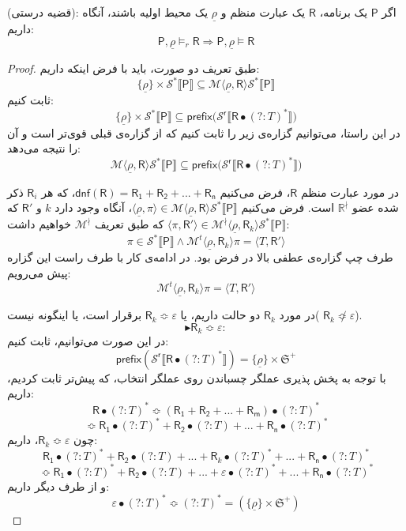 \begin{thm}
	(قضیه درستی): اگر $\mathsf{P}$ یک برنامه، $\mathsf{R}$ یک عبارت منظم و $\underline{\rho}$ یک محیط اولیه باشند، آنگاه داریم:
	$$\mathsf{P},\underline{\rho} \models_r \mathsf{R} \Rightarrow
	\mathsf{P},\underline{\rho} \models \mathsf{R}$$
\end{thm}
\begin{proof}
	طبق تعریف دو صورت، باید با فرض اینکه داریم:
	$$\{\underline{\rho}\}\times\mathcal{S}^* \llbracket \mathsf{P} \rrbracket \subseteq 
	\mathcal{M}\langle \underline{\rho},\mathsf{R} \rangle \mathcal{S}^* \llbracket \mathsf{P} \rrbracket$$
	ثابت کنیم:
	$$\{\underline{\rho}\}\times\mathcal{S}^* \llbracket \mathsf{P} \rrbracket \subseteq 
	\mathsf{prefix(\mathcal{S}^r \llbracket R \bullet (?:\mathit{T})^*} \rrbracket)$$
	در این راستا، می‌توانیم گزاره‌ی زیر را ثابت کنیم که از گزاره‌ی قبلی قوی‌تر است و آن را نتیجه می‌دهد:
	$$\mathcal{M}\langle \underline{\rho},\mathsf{R} \rangle \mathcal{S}^* \llbracket \mathsf{P} \rrbracket \subseteq \mathsf{prefix(\mathcal{S}^r \llbracket R \bullet (?:\mathit{T})^*} \rrbracket)$$
	
	در مورد عبارت منظم $\mathsf{R}$، فرض می‌کنیم
	$\mathsf{dnf(R)=R_1+R_2+...+R_n}$،
	که هر $\mathsf{R}_i$ ذکر شده عضو $\mathbb{R}^\nmid$ است. 
	فرض می‌کنیم
	$\langle \underline{\rho}, \pi \rangle \in \mathcal{M}\langle \underline{\rho},\mathsf{R} \rangle \mathcal{S}^* \llbracket \mathsf{P} \rrbracket$،
	آنگاه وجود دارد $k$ و $\mathsf{R'}$ که \break
	$\langle \pi , \mathsf{R'} \rangle  \in \mathcal{M}^\nmid\langle \underline{\rho},\mathsf{R}_k \rangle \mathcal{S}^* \llbracket \mathsf{P} \rrbracket$
	که طبق تعریف $\mathcal{M}^\nmid$ خواهیم داشت:
	$$\pi \in \mathcal{S}^* \llbracket \mathsf{P} \rrbracket \land \mathcal{M}^t \langle \underline{\rho},\mathsf{R}_k \rangle \pi = \langle \mathit{T},\mathsf{R'} \rangle$$
	طرف چپ گزاره‌ی عطفی بالا در فرض بود. در ادامه‌ی کار با طرف راست این گزاره پیش می‌رویم:
	$$\mathcal{M}^t \langle \underline{\rho},\mathsf{R}_k\rangle \pi = \langle \mathit{T},\mathsf{R'} \rangle$$

در مورد $\mathsf{R}_k$ دو حالت داریم، یا 
$\mathsf{R}_k \Bumpeq \varepsilon$
برقرار است، یا اینگونه نیست( 
$\mathsf{R}_k \not\Bumpeq \varepsilon$).
$$\blacktriangleright\mathsf{R}_k \Bumpeq \varepsilon:$$
در این صورت می‌توانیم، ثابت کنیم: 
$$\mathsf{prefix(\mathcal{S}^r \llbracket \mathsf{R} \bullet (?:\mathit{T})^* \rrbracket)}=
	\{\underline{\rho}\} \times \mathfrak{S}^+$$
با توجه به پخش پذیری عملگر چسباندن روی عملگر انتخاب، که پیش‌تر ثابت کردیم، داریم:
$$\mathsf{R}\bullet(?:\mathit{T})^* \Bumpeq \mathsf{(R_1 + R_2 + ... +R_m)}\bullet(?:\mathit{T})^*$$
$$\Bumpeq \mathsf{R_1}\bullet (?:\mathit{T})^* + \mathsf{R_2} \bullet (?:\mathit{T})+...+ \mathsf{R_n} \bullet (?:\mathit{T})^*$$
چون $\mathsf{R}_k \Bumpeq \varepsilon$، داریم:
$$\mathsf{R_1}\bullet (?:\mathit{T})^* + \mathsf{R_2} \bullet (?:\mathit{T})+...+ \mathsf{R}_k \bullet (?:\mathit{T})^* +...+ \mathsf{R_n} \bullet (?:\mathit{T})^*$$
$$\Bumpeq \mathsf{R_1}\bullet (?:\mathit{T})^* + \mathsf{R_2} \bullet (?:\mathit{T})+...+ \varepsilon \bullet (?:\mathit{T})^* +...+ \mathsf{R_n} \bullet (?:\mathit{T})^*$$
و از طرف دیگر داریم:
$$\varepsilon \bullet (?:\mathit{T})^* \Bumpeq (?:\mathit{T})^* = (\{\underline{\rho}\} \times \mathfrak{S}^+)$$  


\end{proof}
